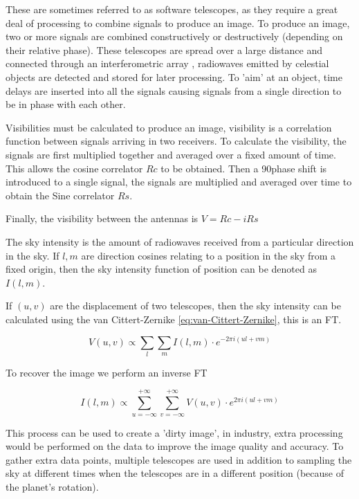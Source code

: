 These are sometimes referred to as software telescopes, as they require a great deal of processing to combine signals to produce an image. To produce an image, two or more signals are combined constructively or destructively (depending on their relative phase). These telescopes are spread over a large distance and connected through an interferometric array \textcite{Borcea_2005}, radiowaves emitted by celestial objects are detected and stored for later processing. To 'aim' at an object, time delays are inserted into all the signals causing signals from a single direction to be in phase with each other.

Visibilities must be calculated to produce an image, visibility is a correlation function between signals arriving in two receivers. To calculate the visibility, the signals are first multiplied together and averaged over a fixed amount of time. This allows the cosine correlator $Rc$ to be obtained. Then a 90\textdegree phase shift is introduced to a single signal, the signals are multiplied and averaged over time to obtain the Sine correlator $Rs$.

Finally, the visibility between the antennas is $V =Rc - iRs$

The sky intensity is the amount of radiowaves received from a particular direction in the sky. If $l, m$ are direction cosines relating to a position in the sky from a fixed origin, then the sky intensity function of position can be denoted as $I(l,m)$.

If $(u, v)$ are the displacement of two telescopes, then the sky intensity can be calculated using the van Cittert-Zernike \autoref{eq:van-Cittert-Zernike}, this is an FT.

\begin{equation}
V(u, v) \propto \sum_{l} \sum_{m} I(l, m) \cdot e^{-2\pi i(ul + vm)}
\label{eq:van-Cittert-Zernike}
\end{equation}

To recover the image we perform an inverse FT 

\begin{equation}
I(l, m) \propto \sum_{u=-\infty}^{+\infty} \sum_{v=-\infty}^{+\infty} V(u, v) \cdot e^{2\pi i(ul + vm)}
\label{eq:van-Cittert-Zernike-inverse}
\end{equation}

This process can be used to create a 'dirty image', in industry, extra processing would be performed on the data to improve the image quality and accuracy. To gather extra data points, multiple telescopes are used in addition to sampling the sky at different times when the telescopes are in a different position (because of the planet's rotation).

